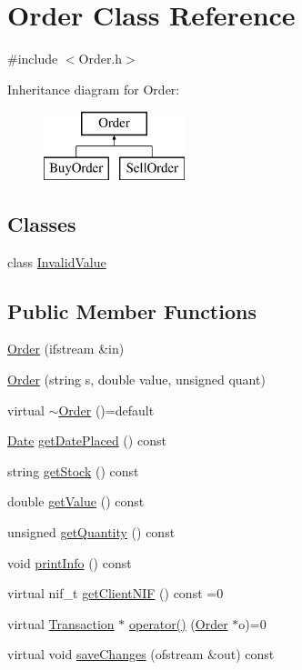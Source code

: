 \hypertarget{class_order}{}\section{Order Class Reference}
\label{class_order}


{\ttfamily \#include $<$Order.\+h$>$}

Inheritance diagram for Order\+:\begin{figure}[H]
\begin{center}
\leavevmode
\includegraphics[height=2.000000cm]{class_order}
\end{center}
\end{figure}
\subsection*{Classes}
\begin{DoxyCompactItemize}
\item 
class \hyperlink{class_order_1_1_invalid_value}{Invalid\+Value}
\end{DoxyCompactItemize}
\subsection*{Public Member Functions}
\begin{DoxyCompactItemize}
\item 
\hyperlink{class_order_afd9bc0f1cf5ad376154ffde0e2727fbb}{Order} (ifstream \&in)
\item 
\hyperlink{class_order_afdda61d21957bffaf29e666ee6741bdc}{Order} (string s, double value, unsigned quant)
\item 
virtual \hyperlink{class_order_aa29be853510781d514722f857ab1698a}{$\sim$\+Order} ()=default
\item 
\hyperlink{class_date}{Date} \hyperlink{class_order_a8ffb9095f78f8a3b1942e7995516007c}{get\+Date\+Placed} () const
\item 
string \hyperlink{class_order_aa008956fd77ac3d254117443b7d916fa}{get\+Stock} () const
\item 
double \hyperlink{class_order_a7e93f84ff8b0468aef7e7ee23ea1979c}{get\+Value} () const
\item 
unsigned \hyperlink{class_order_a1d34436da1dbc3ffad588505eca5ff49}{get\+Quantity} () const
\item 
void \hyperlink{class_order_a718aea4e96286f2333222d6414eaa317}{print\+Info} () const
\item 
virtual nif\+\_\+t \hyperlink{class_order_a9831f386726f74ee20eea13a46282e13}{get\+Client\+N\+IF} () const =0
\item 
virtual \hyperlink{class_transaction}{Transaction} $\ast$ \hyperlink{class_order_a85d5de18c8664085619e3a5c74d47a25}{operator()} (\hyperlink{class_order}{Order} $\ast$o)=0
\item 
virtual void \hyperlink{class_order_a83989bde0a9b40cbeb0e87c965f6096e}{save\+Changes} (ofstream \&out) const
\end{DoxyCompactItemize}
